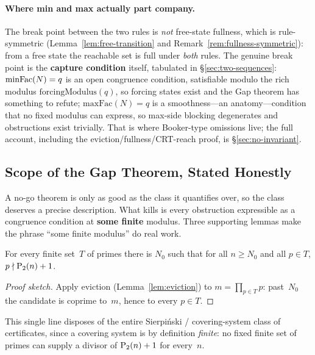 \paragraph{Where min and max actually part company.}
The break point between the two rules is \emph{not} free-state
fullness, which is rule-symmetric (Lemma~\ref{lem:free-transition}
and Remark~\ref{rem:fullness-symmetric}): from a free state the
reachable set is full under \emph{both} rules.  The genuine break
point is the \textbf{capture condition} itself, tabulated in
\S\ref{sec:two-sequences}: $\mathrm{minFac}(N) = q$ is an open congruence
condition, satisfiable modulo the rich modulus
$\mathrm{forcingModulus}(q)$, so forcing states exist and the Gap
theorem has something to refute; $\mathrm{maxFac}(N) = q$ is a
smoothness---an anatomy---condition that no fixed modulus can
express, so max-side blocking degenerates and obstructions exist
trivially.  That is where Booker-type omissions live; the full
account, including the eviction/fullness/CRT-reach proof, is
\S\ref{sec:no-invariant}.

\subsection{Scope of the Gap Theorem, Stated Honestly}
\label{sec:gap-scope}

A no-go theorem is only as good as the class it quantifies over, so
the class deserves a precise description.  What
 kills is every obstruction expressible as
a congruence condition at \textbf{some finite} modulus.  Three
supporting lemmas make the phrase ``some finite modulus'' do real
work.

\begin{lemma}
\label{lem:no-finite-covering}
For every finite set~$T$ of primes there is $N_0$ such that for all
$n \geq N_0$ and all $p \in T$, $p \nmid \mathrm{P}_{2}(n)+1$.
\end{lemma}

\begin{proof}[Proof sketch]
Apply eviction (Lemma~\ref{lem:eviction}) to $m = \prod_{p \in T} p$:
past~$N_0$ the candidate is coprime to~$m$, hence to every $p \in T$.
\end{proof}

\noindent
This single line disposes of the entire Sierpi\'nski / covering-system
class of certificates, since a covering system is by definition
\emph{finite}: no fixed finite set of primes can supply a divisor of
$\mathrm{P}_{2}(n)+1$ for every~$n$.

